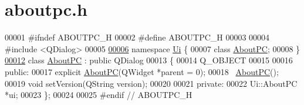 \hypertarget{aboutpc_8h_source}{}\section{aboutpc.\+h}
\label{aboutpc_8h_source}

\begin{DoxyCode}
00001 \textcolor{preprocessor}{#ifndef ABOUTPC\_H}
00002 \textcolor{preprocessor}{#define ABOUTPC\_H}
00003 
00004 \textcolor{preprocessor}{#include <QDialog>}
00005 
\hypertarget{aboutpc_8h_source.tex_l00006}{}\hyperlink{namespace_ui}{00006} \textcolor{keyword}{namespace }\hyperlink{namespace_ui}{Ui} \{
00007 \textcolor{keyword}{class }\hyperlink{class_about_p_c}{AboutPC};
00008 \}
\hypertarget{aboutpc_8h_source.tex_l00012}{}\hyperlink{class_about_p_c}{00012} \textcolor{keyword}{class }\hyperlink{class_about_p_c}{AboutPC} : \textcolor{keyword}{public} QDialog
00013 \{
00014     Q\_OBJECT
00015 
00016 \textcolor{keyword}{public}:
00017     \textcolor{keyword}{explicit} \hyperlink{class_about_p_c}{AboutPC}(QWidget *parent = 0);
00018     ~\hyperlink{class_about_p_c}{AboutPC}();
00019     \textcolor{keywordtype}{void} setVersion(QString version);
00020 
00021 \textcolor{keyword}{private}:
00022     Ui::AboutPC *ui;
00023 \};
00024 
00025 \textcolor{preprocessor}{#endif // ABOUTPC\_H}
\end{DoxyCode}
